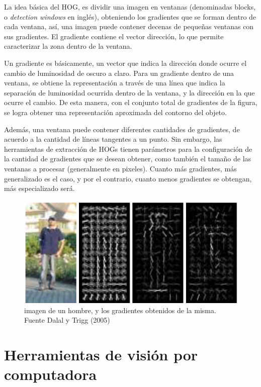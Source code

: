 \documentclass[a4paper,12pt,oneside,spanish]{book}
\begin{document}
La idea básica del HOG, es dividir una imagen en ventanas (denominadas blocks, o \textit{detection windows} en inglés), obteniendo los gradientes que se forman dentro de cada ventana, así, una imagen puede contener decenas de pequeñas ventanas con sus gradientes. El gradiente contiene el vector dirección, lo que permite caracterizar la zona dentro de la ventana.\par

Un gradiente es básicamente, un vector que indica la dirección donde ocurre el cambio de luminosidad de oscuro a claro. Para un gradiente dentro de una ventana, se obtiene la representación a través de una línea que indica la separación de luminosidad ocurrida dentro de la ventana, y la dirección en la que ocurre el cambio. De esta manera, con el conjunto total de gradientes de la figura, se logra obtener una representación aproximada del contorno del objeto.\par

Además, una ventana puede contener diferentes cantidades de gradientes, de acuerdo a la cantidad de líneas tangentes a un punto. Sin embargo, las herramientas de extracción de HOGs tienen parámetros para la configuración de la cantidad de gradientes que se desean obtener, como también el tamaño de las ventanas a procesar (generalmente en pixeles). Cuanto más gradientes, más generalizado es el caso, y por el contrario, cuanto menos gradientes se obtengan, más especializado será.\par

\begin{figure}[h!]
	\includegraphics[width=340pt]{Imagenes/hog1.jpg}
	\centering
	\caption{imagen de un hombre, y los gradientes obtenidos de la misma. Fuente Dalal y Trigg (2005) \cite{hog1} }
	\label{fig:hog1}
\end{figure}
 

\section{Herramientas de visión por computadora}\label{herramientasdevisionporcomputadora}
\end{document}
